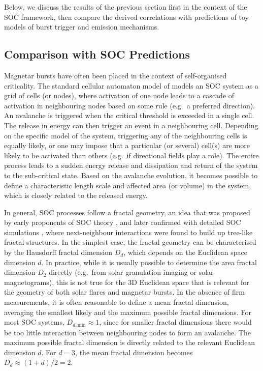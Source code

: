 \documentclass[12pt]{emulateapj}
\begin{document}
Below, we discuss the results of the previous section first in the context of the SOC framework, then compare the derived correlations with predictions of toy models of burst trigger and
emission mechanisms.

\subsection{Comparison with SOC Predictions}
\label{ch6:soc}

Magnetar bursts have often been placed in the context of self-organised criticality. The standard cellular automaton model of \citet{bak1987} models an 
SOC system as a grid of cells (or nodes), where activation of one node leads to a cascade of activation in neighbouring nodes based on some rule 
(e.g.\ a preferred direction). An avalanche is triggered when the critical threshold is exceeded in a single cell. The release in energy can then trigger an event in a neighbouring cell. Depending
on the specific model of the system, triggering any of the neighbouring cells is equally likely, or one may impose that a particular (or several) cell(s) are more likely to be activated than others (e.g.\
if directional fields play a role).
The entire process leads to a sudden energy release and dissipation and return of the system to the sub-critical state.
Based on the avalanche evolution, it becomes possible to define a characteristic length scale and affected 
area (or volume) in the system, which is closely related to the released energy. 

In general, SOC processes follow a fractal geometry, an idea that was proposed by early proponents of SOC theory \citep{bak1989}, and later
confirmed with detailed SOC simulations \citep{aschwanden2012a}, where next-neighbour interactions were found to build up tree-like fractal structures. In the simplest case,
the fractal geometry can be characterised by the Hausdorff fractal dimension $D_d$, which depends on the Euclidean space
dimension $d$. In practice, while it is usually possible to determine the area fractal dimension $D_2$ directly (e.g.\ from solar granulation imaging or solar
magnetograms), this is not true for the $3$D Euclidean space that is relevant for the geometry of both solar flares and magnetar bursts. 
In the absence of firm measurements, it is often reasonable to define a mean fractal dimension, averaging the smallest likely and the maximum possible fractal dimensions.
For most SOC systems, $D_{d,\mathrm{min}} \approx 1$, since for smaller fractal dimensions there would be too little interaction between neighbouring nodes to form an avalanche.
The maximum possible fractal dimension is directly related to the relevant Euclidean dimension $d$. For $d=3$, the mean fractal dimension becomes $D_d \approx (1+d)/2 = 2$. 
\end{document}
